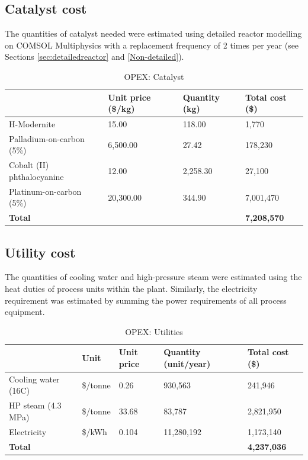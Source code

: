 \subsection{Catalyst cost}
 The quantities of catalyst needed were estimated using detailed reactor modelling on COMSOL Multiphysics with a replacement frequency of 2 times per year (see Sections \ref{sec:detailedreactor} and \ref{Non-detailed}).

\begin{table}[H]
\centering
\caption{OPEX: Catalyst}
\label{tab:opex-catalyst}
\begin{tabular}{llll}
\toprule
\textbf{}                  & \textbf{Unit price (\$/kg)} & \textbf{Quantity (kg)} & \textbf{Total cost (\$)} \\ \midrule
H-Modernite                & 15.00                       & 118.00                 & 1,770                    \\
Palladium-on-carbon (5\%)  & 6,500.00                    & 27.42                  & 178,230                  \\
Cobalt (II) phthalocyanine & 12.00                       & 2,258.30               & 27,100                   \\
Platinum-on-carbon (5\%)   & 20,300.00                   & 344.90                 & 7,001,470                \\ 
\textbf{Total}             &                             &                        & \textbf{7,208,570}  \\\bottomrule    
\end{tabular}
\end{table}

\subsection{Utility cost}
 The quantities of cooling water and high-pressure steam were estimated using the heat duties of process units within the plant. Similarly, the electricity requirement was estimated by summing the power requirements of all process equipment.
 \begin{table}[H]
\centering
\caption{OPEX: Utilities}
\label{tab:opex-utilities}
\begin{tabular}{lllll}
\toprule
\textbf{}            & \textbf{Unit} & \textbf{Unit price} & \textbf{Quantity (unit/year)} & \textbf{Total cost (\$)} \\\midrule
Cooling water  (16C) & \$/tonne      & 0.26                & 930,563                       & 241,946                  \\
HP steam (4.3 MPa)   & \$/tonne      & 33.68               & 83,787                        & 2,821,950                \\
Electricity          & \$/kWh        & 0.104               & 11,280,192                    & 1,173,140                \\
\textbf{Total}       & \textbf{}     & \textbf{}           & \textbf{}                     & \textbf{4,237,036}      \\\bottomrule
\end{tabular}
\end{table}

